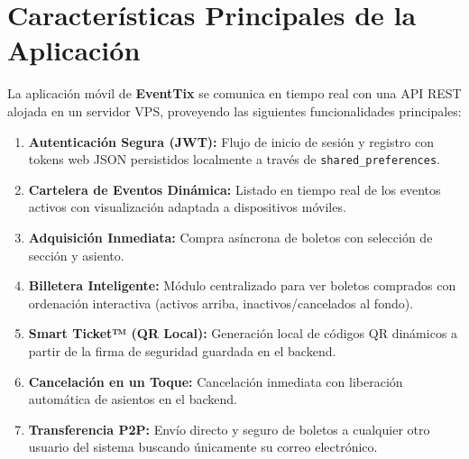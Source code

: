 \section{Características Principales de la Aplicación}

La aplicación móvil de \textbf{EventTix} se comunica en tiempo real con una API REST alojada en un servidor VPS, proveyendo las siguientes funcionalidades principales:

\begin{enumerate}
    \item \textbf{Autenticación Segura (JWT):} Flujo de inicio de sesión y registro con tokens web JSON persistidos localmente a través de \texttt{shared\_preferences}.
    \item \textbf{Cartelera de Eventos Dinámica:} Listado en tiempo real de los eventos activos con visualización adaptada a dispositivos móviles.
    \item \textbf{Adquisición Inmediata:} Compra asíncrona de boletos con selección de sección y asiento.
    \item \textbf{Billetera Inteligente:} Módulo centralizado para ver boletos comprados con ordenación interactiva (activos arriba, inactivos/cancelados al fondo).
    \item \textbf{Smart Ticket™ (QR Local):} Generación local de códigos QR dinámicos a partir de la firma de seguridad guardada en el backend.
    \item \textbf{Cancelación en un Toque:} Cancelación inmediata con liberación automática de asientos en el backend.
    \item \textbf{Transferencia P2P:} Envío directo y seguro de boletos a cualquier otro usuario del sistema buscando únicamente su correo electrónico.
\end{enumerate}
